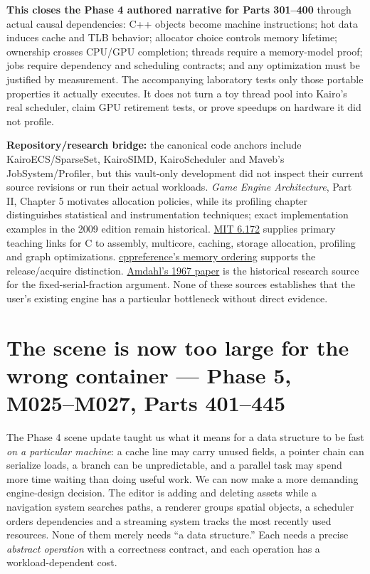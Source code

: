 \textbf{This closes the Phase 4 authored narrative for Parts 301--400} through actual causal dependencies: C++ objects become machine instructions; hot data induces cache and TLB behavior; allocator choice controls memory lifetime; ownership crosses CPU/GPU completion; threads require a memory-model proof; jobs require dependency and scheduling contracts; and any optimization must be justified by measurement. The accompanying laboratory tests only those portable properties it actually executes. It does not turn a toy thread pool into Kairo's real scheduler, claim GPU retirement tests, or prove speedups on hardware it did not profile.

\textbf{Repository/research bridge:} the canonical code anchors include KairoECS/SparseSet, KairoSIMD, KairoScheduler and Maveb's JobSystem/Profiler, but this vault-only development did not inspect their current source revisions or run their actual workloads. \emph{Game Engine Architecture}, Part II, Chapter 5 motivates allocation policies, while its profiling chapter distinguishes statistical and instrumentation techniques; exact implementation examples in the 2009 edition remain historical. \href{https://ocw.mit.edu/courses/6-172-performance-engineering-of-software-systems-fall-2018/video_galleries/lecture-videos/}{MIT 6.172} supplies primary teaching links for C to assembly, multicore, caching, storage allocation, profiling and graph optimizations. \href{https://en.cppreference.com/w/cpp/atomic/memory_order}{cppreference's memory ordering} supports the release/acquire distinction. \href{https://doi.org/10.1145/1465482.1465560}{Amdahl's 1967 paper} is the historical research source for the fixed-serial-fraction argument. None of these sources establishes that the user's existing engine has a particular bottleneck without direct evidence.

\section{The scene is now too large for the wrong container --- Phase 5, M025--M027, Parts 401--445}\label{05-engine-i-ch007-the-scene-is-now-too-large-for-the-wrong-container-phase-5-m025m027-parts-401445}

The Phase 4 scene update taught us what it means for a data structure to be fast \emph{on a particular machine}: a cache line may carry unused fields, a pointer chain can serialize loads, a branch can be unpredictable, and a parallel task may spend more time waiting than doing useful work. We can now make a more demanding engine-design decision. The editor is adding and deleting assets while a navigation system searches paths, a renderer groups spatial objects, a scheduler orders dependencies and a streaming system tracks the most recently used resources. None of them merely needs ``a data structure.'' Each needs a precise \emph{abstract operation} with a correctness contract, and each operation has a workload-dependent cost.

